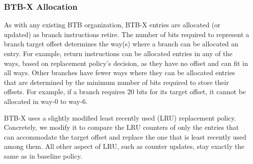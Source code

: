 \subsubsection{BTB-X Allocation}
As with any existing BTB organization, BTB-X entries are allocated (or updated) as branch instructions retire. The number of bits required to represent a branch target offset determines the way(s) where a branch can be allocated an entry. For example, return instructions can be allocated entries in any of the ways, based on replacement policy's decision, as they have no offset and can fit in all ways. Other branches have fewer ways where they can be allocated entries that are determined by the minimum number of bits required to store their offsets. For example, if a branch requires 20 bits for its target offset, it cannot be allocated in way-0 to way-6.

BTB-X uses a slightly modified least recently used (LRU) replacement policy. Concretely, we modify it to compare the LRU counters of only the entries that can accommodate the target offset and replace the one that is least recently used among them. All other aspect of LRU, such as counter updates, stay exactly the same as in baseline policy.




